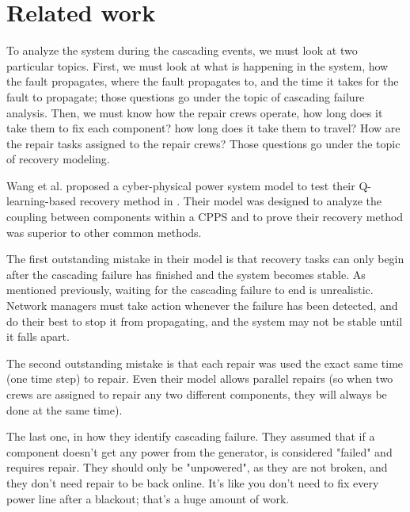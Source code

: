 \documentclass[runningheads]{llncs}
\begin{document}
\section{Related work}

To analyze the system during the cascading events, we must look at two particular topics. 
First, we must look at what is happening in the system, how the fault propagates, where the fault propagates to, and the time it takes for the fault to propagate; those questions go under the topic of cascading failure analysis. 
Then, we must know how the repair crews operate, how long does it take them to fix each component? how long does it take them to travel? How are the repair tasks assigned to the repair crews? Those questions go under the topic of recovery modeling. 


Wang et al. proposed a cyber-physical power system model to test their Q-learning-based recovery method in \cite{wang_q-learning-based_2025}. Their model was designed to analyze the coupling between components within a CPPS and to prove their recovery method was superior to other common methods. 

The first outstanding mistake in their model is that recovery tasks can only begin after the cascading failure has finished and the system becomes stable. As mentioned previously, waiting for the cascading failure to end is unrealistic. Network managers must take action whenever the failure has been detected, and do their best to stop it from propagating, and the system may not be stable until it falls apart.

The second outstanding mistake is that each repair was used the exact same time (one time step) to repair. Even their model allows parallel repairs (so when two crews are assigned to repair any two different components, they will always be done at the same time).

The last one, in how they identify cascading failure. They assumed that if a component doesn't get any power from the generator, is considered "failed" and requires repair. They should only be "unpowered", as they are not broken, and they don't need repair to be back online. It's like you don't need to fix every power line after a blackout; that's a huge amount of work. 
\end{document}

